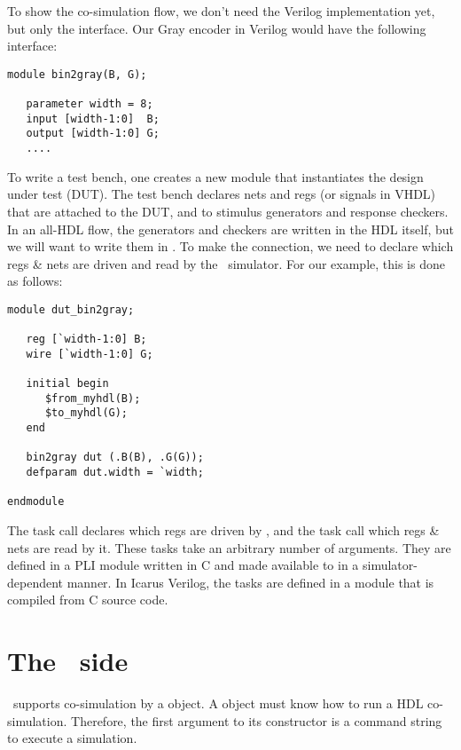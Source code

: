To show the co-simulation flow, we don't need the Verilog
implementation yet, but only the interface.  Our Gray encoder in
Verilog would have the following interface:

\begin{verbatim}
module bin2gray(B, G);

   parameter width = 8;
   input [width-1:0]  B;     
   output [width-1:0] G;
   ....

\end{verbatim}

To write a test bench, one creates a new module that instantiates the
design under test (DUT).  The test bench declares nets and
regs (or signals in VHDL) that are attached to the DUT, and to
stimulus generators and response checkers. In an all-HDL flow, the
generators and checkers are written in the HDL itself, but we will
want to write them in \myhdl{}. To make the connection, we need to
declare which regs \& nets are driven and read by the \myhdl\
simulator. For our example, this is done as follows:

\begin{verbatim}
module dut_bin2gray;

   reg [`width-1:0] B;
   wire [`width-1:0] G;

   initial begin
      $from_myhdl(B);
      $to_myhdl(G);
   end

   bin2gray dut (.B(B), .G(G));
   defparam dut.width = `width;

endmodule

\end{verbatim}

The  task call declares which regs are driven by
\myhdl{}, and the \code{\$to_myhdl} task call which regs \& nets are read
by it. These tasks take an arbitrary number of arguments.  They are
defined in a PLI module written in C and made available to in a
simulator-dependent manner.  In Icarus Verilog, the tasks are defined
in a \code{myhdl.vpi} module that is compiled from C source code.

\section{The \myhdl\ side}

\myhdl\ supports co-simulation by a  object. 
A \code{Cosimulation} object must know how to run a HDL co-simulation.
Therefore, the first argument to its constructor is a command string
to execute a simulation.

